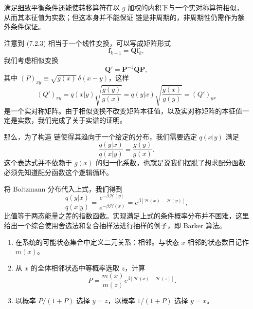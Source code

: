 满足细致平衡条件还能使转移算符在以 $g$ 加权的内积下与一个实对称算符相似，从而其本征值为实数；但这本身并不能保证  链是非周期的，非周期性仍需作为额外条件保证。

注意到 (7.2.3) 相当于一个线性变换，可以写成矩阵形式
\begin{equation}
 \bm f_{k+1}=\mathbf Q\bm f_k,
\tag{7.3.4}
\end{equation}
我们考虑相似变换
\begin{equation}
 \mathbf Q'=\mathbf P^{-1}\mathbf Q\mathbf P,
\tag{7.3.5}
\end{equation}
其中 $(P)_{xy}\equiv\sqrt{g(x)}\,\delta(x-y)$，这样
\begin{equation}
 (Q')_{xy}=q(x|y)\sqrt{\frac{g(y)}{g(x)}}
 =q(y|x)\sqrt{\frac{g(x)}{g(y)}}=(Q')_{yx}
\tag{7.3.6}
\end{equation}
是一个实对称矩阵。由于相似变换不改变矩阵本征值，以及实对称矩阵的本征值一定是实数，我们完成了关于实谱的证明。

那么，为了构造  链使得其趋向于一个给定的分布，我们需要选定 $q(x|y)$ 满足
\begin{equation}
 \frac{q(y|x)}{q(x|y)}=\frac{g(y)}{g(x)}.
\tag{7.3.7}
\end{equation}
这个表达式并不依赖于 $g(x)$ 的归一化系数，也就是说我们摆脱了想求配分函数必须先知道配分函数这个逻辑循环。

将 Boltzmann 分布代入上式，我们得到
\begin{equation}
 \frac{q(y|x)}{q(x|y)}
 =\frac{e^{-\beta\mathcal H(y)}}{e^{-\beta\mathcal H(x)}}
 =e^{\beta[\mathcal H(x)-\mathcal H(y)]},
\tag{7.3.8}
\end{equation}
比值等于两态能量之差的指数函数。实现满足上式的条件概率分布并不困难，这里给出一个综合使用舍选法和复合抽样法进行抽样的例子，即 Barker 算法。

\begin{algorithmBox}
\begin{enumerate}[label=\arabic*.,leftmargin=2em]
\item 在系统的可能状态集合中定义二元关系：相邻。与状态 $x$ 相邻的状态数目记作 $m(x)$。
\item 从 $x$ 的全体相邻状态中等概率选取 $z$，计算
\[
 P=\frac{m(x)}{m(z)}e^{\beta[\mathcal H(x)-\mathcal H(z)]}.
\]
\item 以概率 $P/(1+P)$ 选择 $y=z$，以概率 $1/(1+P)$ 选择 $y=x$。
\end{enumerate}
\end{algorithmBox}

